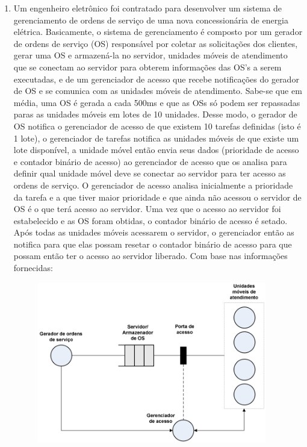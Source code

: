 \documentclass[a4paper,10pt]{article}
\begin{document}
\begin{enumerate}
  \item Um engenheiro eletrônico foi contratado para desenvolver um sistema de gerenciamento de ordens de serviço de uma nova concessionária de 
      energia elétrica. Basicamente, o sistema de gerenciamento é composto por um gerador de ordens de serviço (OS) responsável por coletar as 
      solicitações dos clientes, gerar uma OS e armazená-la no servidor, unidades móveis de atendimento que se conectam ao servidor para obterem 
      informações das OS’s a serem executadas, e de um gerenciador de acesso que recebe notificações do gerador de OS e se comunica com as unidades 
      móveis de atendimento. Sabe-se que em média, uma OS é gerada a cada 500ms e que as OSs só podem ser repassadas paras as unidades móveis em lotes 
      de 10 unidades. Desse modo, o gerador de OS notifica o gerenciador de acesso de que existem 10 tarefas definidas (isto é 1 lote), o gerenciador 
      de tarefas notifica as unidades móveis de que existe um lote disponível, a unidade móvel então envia seus dados (prioridade de acesso e contador 
      binário de acesso) ao gerenciador de acesso que os analisa para definir qual unidade móvel deve se conectar ao servidor para ter acesso as 
      ordens de serviço. O gerenciador de acesso analisa inicialmente a prioridade da tarefa e a que tiver maior prioridade e que ainda não acessou o 
      servidor de OS é o que terá acesso ao servidor. Uma vez que o acesso ao servidor foi estabelecido e as OS foram obtidas, o contador binário de 
      acesso é setado. Após todas as unidades móveis acessarem o servidor, o gerenciador então as notifica para que elas possam resetar o contador 
      binário de acesso para que possam então ter o acesso ao servidor liberado. Com base nas informações fornecidas:

\begin{figure}[ht]
 \center
 \includegraphics[width=10cm]{imagem/q2.png}
\end{figure}


\end{enumerate}
\end{document}
